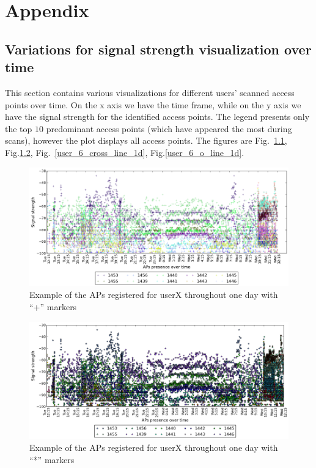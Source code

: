 \chapter{Appendix}

\section{Variations for signal strength visualization over time}
\label{appendix_signal_strength}

This section contains various visualizations for different users' scanned access
points over time. On the x axis we have the time frame, while on the y axis we
have the signal strength for the identified access points. The legend presents
only the top $10$ predominant access points (which have appeared the most
during scans), however the plot displays all access points. The figures are
Fig.~\ref{user_6_cross_1d}, Fig.\ref{user_6_star_1d},
Fig.~\ref{user_6_cross_line_1d}, Fig.\ref{user_6_o_line_1d}.

\begin{figure}[h]
\centering
\includegraphics[height =
0.45\textwidth]{figures/cros_user_6_sorted_1days_plot.png}
\caption{Example of the APs registered for userX throughout one day with
``+'' markers}
\label{user_6_cross_1d}
\end{figure}

\begin{figure}[h]
\centering
\includegraphics[height =
0.45\textwidth]{figures/star_user_6_sorted_1days_plot.png}
\caption{Example of the APs registered for userX throughout one day with
``*'' markers}
\label{user_6_star_1d}
\end{figure}

